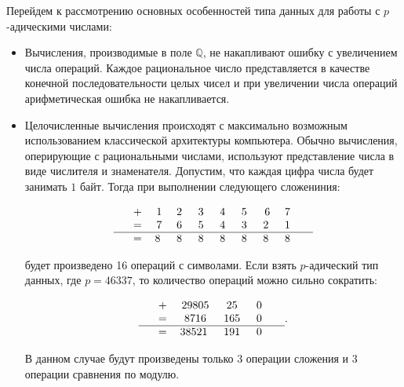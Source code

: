 \documentclass[master, och, times, pract]{sty/SCWorks}
\theoremstyle{plain}
\theoremstyle{definition}
\numberwithin{equation}{section}
\begin{document}
Перейдем к рассмотрению основных особенностей типа данных для работы с $p$-адическими числами:

\begin{itemize}

\item Вычисления, производимые в поле $\mathbb{Q}$, не накапливают ошибку с увеличением числа операций. Каждое рациональное число представляется в качестве конечной последовательности целых чисел и при увеличении числа операций арифметическая ошибка не накапливается\cite{bib:computation:gregory}.

\item Целочисленные вычисления происходят с максимально возможным использованием классической архитектуры компьютера. Обычно вычисления, оперирующие с рациональными числами, используют представление числа в виде числителя и знаменателя. Допустим, что каждая цифра числа будет занимать $1$ байт. Тогда при выполнении следующего сложениния:

$$
\begin{tabular}{ccccccccccc}
& + & 1 & 2\; & 3\; & 4\; & 5\; & 6 & 7\; &  \\
& = & 7 & 6\; & 5\; & 4\; & 3\; & 2\; & 1\; &  \\
\hline
& = & 8\; & 8\; & 8\; & 8\; & 8\; & 8\; & 8\; &
\end{tabular}
$$

будет произведено 16 операций с символами. Если взять $p$-адический тип данных, где $p=46337$, то количество операций можно сильно сократить:

$$
\begin{tabular}{ccccccccccc}
& + & 29805 & 25\; & 0\; &  \\
& = & 8716 & 165\; & 0\; & \\
\hline
& = & 38521\; & 191\; & 0\; &
\end{tabular}.
$$

В данном случае будут произведены только $3$ операции сложения и $3$ операции сравнения по модулю.


\end{itemize}
\end{document}

